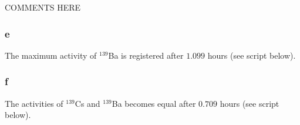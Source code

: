 COMMENTS HERE

\subsubsection*{e}
The maximum activity of $^{139}$Ba is registered after $1.099$ hours (see script below).

\subsubsection*{f}
The activities of $^{139}$Cs and $^{139}$Ba becomes equal after $0.709$ hours (see script below).